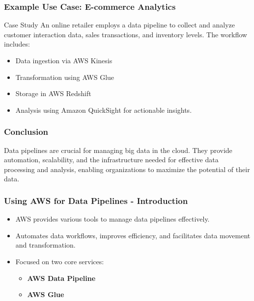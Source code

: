 \documentclass[aspectratio=169]{beamer}
\begin{document}
\begin{frame}[fragile]
    \frametitle{Example Use Case: E-commerce Analytics}
    \begin{block}{Case Study}
        An online retailer employs a data pipeline to collect and analyze customer interaction data, sales transactions, and inventory levels. The workflow includes:
        \begin{itemize}
            \item Data ingestion via AWS Kinesis
            \item Transformation using AWS Glue
            \item Storage in AWS Redshift
            \item Analysis using Amazon QuickSight for actionable insights.
        \end{itemize}
    \end{block}
\end{frame}

\begin{frame}[fragile]
    \frametitle{Conclusion}
    Data pipelines are crucial for managing big data in the cloud. They provide automation, scalability, and the infrastructure needed for effective data processing and analysis, enabling organizations to maximize the potential of their data.
\end{frame}

\begin{frame}
    \titlepage
\end{frame}

\begin{frame}
    \frametitle{Using AWS for Data Pipelines - Introduction}
    \begin{itemize}
        \item AWS provides various tools to manage data pipelines effectively.
        \item Automates data workflows, improves efficiency, and facilitates data movement and transformation.
        \item Focused on two core services: 
        \begin{itemize}
            \item \textbf{AWS Data Pipeline}
            \item \textbf{AWS Glue}
        \end{itemize}
    \end{itemize}
\end{frame}
\end{document}
